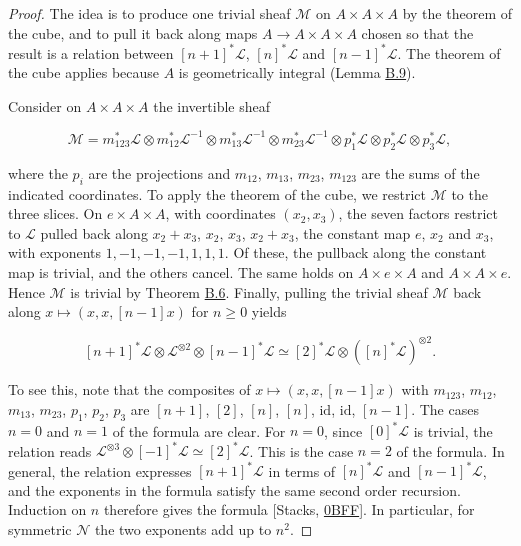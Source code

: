\documentclass[11pt]{article}
\begin{document}
\begin{proof}[{Proof}]\label{bp106}%
The idea is to produce one trivial sheaf \(\mathcal M\) on \(A\times A\times A\) by the theorem of the cube, and to pull it back along maps \(A\to A\times A\times A\) chosen so that the result is a relation between \([n+1]^*\mathcal L\), \([n]^*\mathcal L\) and \([n-1]^*\mathcal L\). The theorem of the cube applies because \(A\) is geometrically integral (Lemma \hyperref[bp100]{B.9}).

Consider on \(A\times A\times A\) the invertible sheaf

\[
\mathcal M=m_{123}^*\mathcal L\otimes m_{12}^*\mathcal L^{-1}\otimes
m_{13}^*\mathcal L^{-1}\otimes m_{23}^*\mathcal L^{-1}\otimes
p_1^*\mathcal L\otimes p_2^*\mathcal L\otimes p_3^*\mathcal L,
\]

where the \(p_i\) are the projections and \(m_{12}\), \(m_{13}\), \(m_{23}\), \(m_{123}\) are the sums of the indicated coordinates. To apply the theorem of the cube, we restrict \(\mathcal M\) to the three slices. On \(e\times A\times A\), with coordinates \((x_2,x_3)\), the seven factors restrict to \(\mathcal L\) pulled back along \(x_2+x_3\), \(x_2\), \(x_3\), \(x_2+x_3\), the constant map \(e\), \(x_2\) and \(x_3\), with exponents \(1,-1,-1,-1,1,1,1\). Of these, the pullback along the constant map is trivial, and the others cancel. The same holds on \(A\times e\times A\) and \(A\times A\times e\). Hence \(\mathcal M\) is trivial by Theorem \hyperref[bp91]{B.6}. Finally, pulling the trivial sheaf \(\mathcal M\) back along \(x\mapsto(x,x,[n-1]x)\) for \(n\ge0\) yields

\[
[n+1]^*\mathcal L\otimes\mathcal L^{\otimes2}
\otimes[n-1]^*\mathcal L
\simeq [2]^*\mathcal L\otimes([n]^*\mathcal L)^{\otimes2}.
\]

To see this, note that the composites of \(x\mapsto(x,x,[n-1]x)\) with \(m_{123}\), \(m_{12}\), \(m_{13}\), \(m_{23}\), \(p_1\), \(p_2\), \(p_3\) are \([n+1]\), \([2]\), \([n]\), \([n]\), \(\mathrm{id}\), \(\mathrm{id}\), \([n-1]\). The cases \(n=0\) and \(n=1\) of the formula are clear. For \(n=0\), since \([0]^*\mathcal L\) is trivial, the relation reads \(\mathcal L^{\otimes3}\otimes[-1]^*\mathcal L\simeq[2]^*\mathcal L\). This is the case \(n=2\) of the formula. In general, the relation expresses \([n+1]^*\mathcal L\) in terms of \([n]^*\mathcal L\) and \([n-1]^*\mathcal L\), and the exponents in the formula satisfy the same second order recursion. Induction on \(n\) therefore gives the formula [Stacks, \href{https://stacks.math.columbia.edu/tag/0BFF}{0BFF}]. In particular, for symmetric \(\mathcal N\) the two exponents add up to \(n^2\).
\end{proof}
\end{document}

